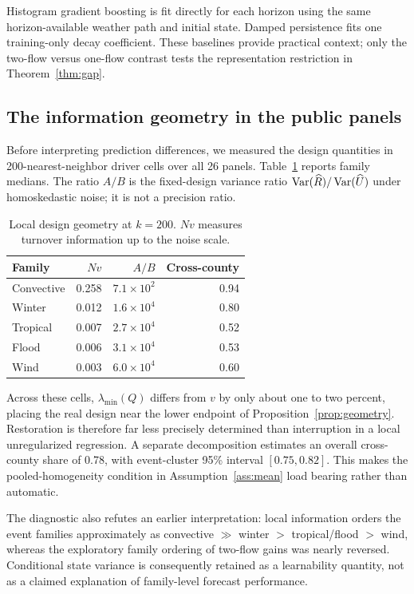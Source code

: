 Histogram gradient boosting is fit directly for each horizon using the same horizon-available weather path and initial state. Damped persistence fits one training-only decay coefficient. These baselines provide practical context; only the two-flow versus one-flow contrast tests the representation restriction in Theorem~\ref{thm:gap}.

\subsection{The information geometry in the public panels}
\label{sec:real_geometry}

Before interpreting prediction differences, we measured the design quantities in 200-nearest-neighbor driver cells over all 26 panels. Table~\ref{tab:geometry} reports family medians. The ratio $A/B$ is the fixed-design variance ratio $\operatorname{Var}(\widehat R)/\operatorname{Var}(\widehat U)$ under homoskedastic noise; it is not a precision ratio.

\begin{table}[t]
\centering
\caption{Local design geometry at $k=200$. $Nv$ measures turnover information up to the noise scale.}
\label{tab:geometry}
\small
\setlength{\tabcolsep}{4pt}
\begin{tabular}{@{}lrrr@{}}
\toprule
Family & $Nv$ & $A/B$ & Cross-county\\
\midrule
Convective & 0.258 & $7.1\times10^2$ & 0.94\\
Winter & 0.012 & $1.6\times10^4$ & 0.80\\
Tropical & 0.007 & $2.7\times10^4$ & 0.52\\
Flood & 0.006 & $3.1\times10^4$ & 0.53\\
Wind & 0.003 & $6.0\times10^4$ & 0.60\\
\bottomrule
\end{tabular}
\end{table}

Across these cells, $\lambda_{\min}(Q)$ differs from $v$ by only about one to two percent, placing the real design near the lower endpoint of Proposition~\ref{prop:geometry}. Restoration is therefore far less precisely determined than interruption in a local unregularized regression. A separate decomposition estimates an overall cross-county share of 0.78, with event-cluster 95\% interval $[0.75,0.82]$. This makes the pooled-homogeneity condition in Assumption~\ref{ass:mean} load bearing rather than automatic.

The diagnostic also refutes an earlier interpretation: local information orders the event families approximately as convective $\gg$ winter $>$ tropical/flood $>$ wind, whereas the exploratory family ordering of two-flow gains was nearly reversed. Conditional state variance is consequently retained as a learnability quantity, not as a claimed explanation of family-level forecast performance.

